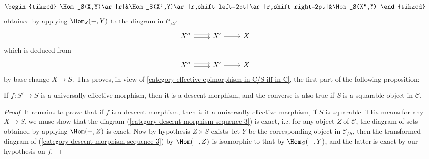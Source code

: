 \begin{equation}\label{category descent morphism sequence-2}
\begin{tikzcd}
\Hom_S(X,Y)\ar[r]&\Hom_S(X',Y)\ar[r,shift left=2pt]\ar[r,shift right=2pt]&\Hom_S(X'',Y)
\end{tikzcd}
\end{equation}
obtained by applying $\Hom_S(-,Y)$ to the diagram in $\mathcal{C}_{/S}$:
\begin{equation}\label{category descent morphism sequence-3}
\begin{tikzcd}
X''\ar[r,shift left=2pt]\ar[r,shift right=2pt]&X'\ar[r]&X
\end{tikzcd}
\end{equation}
which is deduced from
\[\begin{tikzcd}
X''\ar[r,shift left=2pt]\ar[r,shift right=2pt]&X'\ar[r]&X
\end{tikzcd}\]
by base change $X\to S$. This proves, in view of \cref{category effective epimorphism in C/S iff in C}, the first part of the following proposition:

\begin{proposition}\label{category descent morphism and effective morphism}
If $f:S'\to S$ is a universally effective morphism, then it is a descent morphism, and the converse is also true if $S$ is a squarable object in $\mathcal{C}$.
\end{proposition}
\begin{proof}
It remains to prove that if $f$ is a descent morphism, then is it a universally effective morphism, if $S$ is squarable. This means for any $X\to S$, we muse show that the diagram (\ref{category descent morphism sequence-3}) is exact, i.e. for any object $Z$ of $\mathcal{C}$, the diagram of sets obtained by applying $\Hom(-,Z)$ is exact. Now by hypothesis $Z\times S$ exists; let $Y$ be the corresponding object in $\mathcal{C}_{/S}$, then the transformed diagram of (\ref{category descent morphism sequence-3}) by $\Hom(-,Z)$ is isomorphic to that by $\Hom_S(-,Y)$, and the latter is exact by our hypothesis on $f$.
\end{proof}

